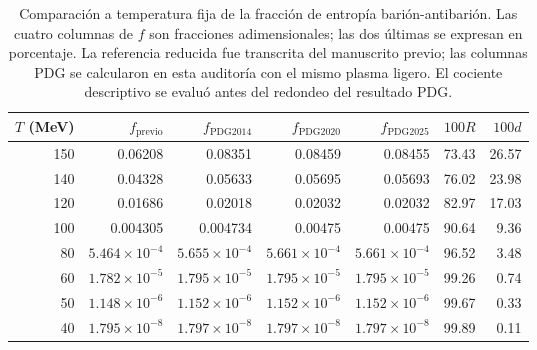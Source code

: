 \begin{table}[t]\centering\footnotesize
\caption{Comparación a temperatura fija de la fracción de entropía barión-antibarión. Las cuatro columnas de $f$ son fracciones adimensionales; las dos últimas se expresan en porcentaje. La referencia reducida fue transcrita del manuscrito previo; las columnas PDG se calcularon en esta auditoría con el mismo plasma ligero. El cociente descriptivo se evaluó antes del redondeo del resultado PDG.}\label{tab:comparison}
\setlength{\tabcolsep}{9pt}\renewcommand{\arraystretch}{1.14}
\begin{tabular}{rrrrrrr}\toprule
$T$ (MeV) & $f_{\mathrm{previo}}$ & $f_{\mathrm{PDG2014}}$ & $f_{\mathrm{PDG2020}}$ & $f_{\mathrm{PDG2025}}$ & $100R$ & $100d$ \\ \midrule
150 & 0.06208 & 0.08351 & 0.08459 & 0.08455 & 73.43 & 26.57 \\
140 & 0.04328 & 0.05633 & 0.05695 & 0.05693 & 76.02 & 23.98 \\
120 & 0.01686 & 0.02018 & 0.02032 & 0.02032 & 82.97 & 17.03 \\
100 & 0.004305 & 0.004734 & 0.00475 & 0.00475 & 90.64 & 9.36 \\
80 & $5.464\times10^{-4}$ & $5.655\times10^{-4}$ & $5.661\times10^{-4}$ & $5.661\times10^{-4}$ & 96.52 & 3.48 \\
60 & $1.782\times10^{-5}$ & $1.795\times10^{-5}$ & $1.795\times10^{-5}$ & $1.795\times10^{-5}$ & 99.26 & 0.74 \\
50 & $1.148\times10^{-6}$ & $1.152\times10^{-6}$ & $1.152\times10^{-6}$ & $1.152\times10^{-6}$ & 99.67 & 0.33 \\
40 & $1.795\times10^{-8}$ & $1.797\times10^{-8}$ & $1.797\times10^{-8}$ & $1.797\times10^{-8}$ & 99.89 & 0.11 \\
\bottomrule\end{tabular}\end{table}
